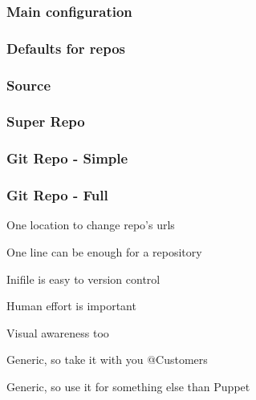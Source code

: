 \begin{frame}
 \frametitle{Main configuration}
 
\end{frame}
\begin{frame}
 \frametitle{Defaults for repos}
 
\end{frame}
\begin{frame}
 \frametitle{Source}
 
\end{frame}
\begin{frame}
 \frametitle{Super Repo}
 
\end{frame}
\begin{frame}
 \frametitle{Git Repo - Simple}
 
\end{frame}
\begin{frame}
 \frametitle{Git Repo - Full}
 
\end{frame}
\begin{iframe}
    \item One location to change repo's urls
    \item One line can be enough for a repository
    \item Inifile is easy to version control
\end{iframe}
\begin{iframe}
\item Human effort is important
\item Visual awareness too
\item Generic, so take it with you @Customers
\item Generic, so use it for something else than Puppet
\end{iframe}




